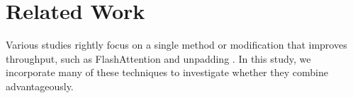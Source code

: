 \documentclass{article}
\begin{document}







\section{Related Work}

Various studies rightly focus on a single method or modification that improves throughput, such as FlashAttention \cite{dao2022flashattention} and unpadding \citep{zeng2022boosting}. In this study, we incorporate many of these techniques to investigate whether they combine advantageously.
\end{document}
